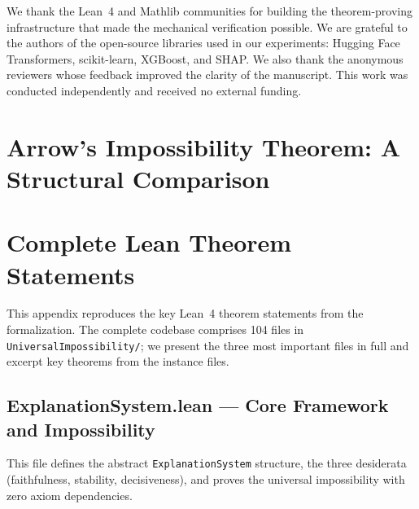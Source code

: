 \documentclass[11pt,a4paper]{article}
\begin{document}
We thank the Lean~4 and Mathlib communities for building the theorem-proving
infrastructure that made the mechanical verification possible.  We are grateful
to the authors of the open-source libraries used in our experiments: Hugging
Face Transformers, scikit-learn, XGBoost, and SHAP.  We also thank the
anonymous reviewers whose feedback improved the clarity of the manuscript.
This work was conducted independently and received no external funding.




\clearpage
\appendix

\section{Arrow's Impossibility Theorem: A Structural Comparison}
\label{app:arrow}



\section{Complete Lean Theorem Statements}
\label{app:lean}

This appendix reproduces the key Lean~4 theorem statements from the
formalization.  The complete codebase comprises 104 files in
\texttt{UniversalImpossibility/}; we present the three most important files
in full and excerpt key theorems from the instance files.

\subsection{ExplanationSystem.lean --- Core Framework and Impossibility}
\label{app:lean-explanation-system}

This file defines the abstract \texttt{ExplanationSystem} structure, the three
desiderata (faithfulness, stability, decisiveness), and proves the universal
impossibility with zero axiom dependencies.
\end{document}
